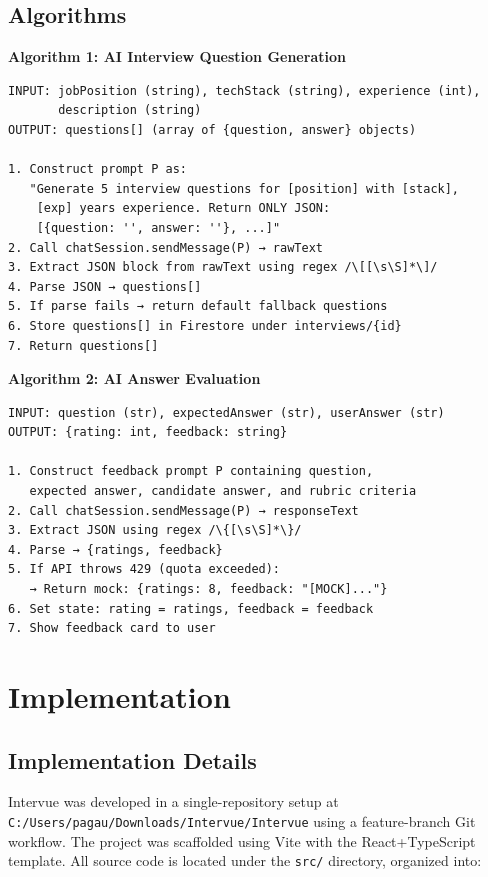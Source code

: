 \section{Algorithms}

\textbf{Algorithm 1: AI Interview Question Generation}
\begin{verbatim}
INPUT: jobPosition (string), techStack (string), experience (int), 
       description (string)
OUTPUT: questions[] (array of {question, answer} objects)

1. Construct prompt P as:
   "Generate 5 interview questions for [position] with [stack],
    [exp] years experience. Return ONLY JSON: 
    [{question: '', answer: ''}, ...]"
2. Call chatSession.sendMessage(P) → rawText
3. Extract JSON block from rawText using regex /\[[\s\S]*\]/
4. Parse JSON → questions[]
5. If parse fails → return default fallback questions
6. Store questions[] in Firestore under interviews/{id}
7. Return questions[]
\end{verbatim}

\textbf{Algorithm 2: AI Answer Evaluation}
\begin{verbatim}
INPUT: question (str), expectedAnswer (str), userAnswer (str)
OUTPUT: {rating: int, feedback: string}

1. Construct feedback prompt P containing question, 
   expected answer, candidate answer, and rubric criteria
2. Call chatSession.sendMessage(P) → responseText
3. Extract JSON using regex /\{[\s\S]*\}/
4. Parse → {ratings, feedback}
5. If API throws 429 (quota exceeded):
   → Return mock: {ratings: 8, feedback: "[MOCK]..."}
6. Set state: rating = ratings, feedback = feedback
7. Show feedback card to user
\end{verbatim}

\chapter{Implementation}

\section{Implementation Details}

Intervue was developed in a single-repository setup at \texttt{C:/Users/pagau/Downloads/Intervue/Intervue}
using a feature-branch Git workflow. The project was scaffolded using Vite with the React+TypeScript
template. All source code is located under the \texttt{src/} directory, organized into:

